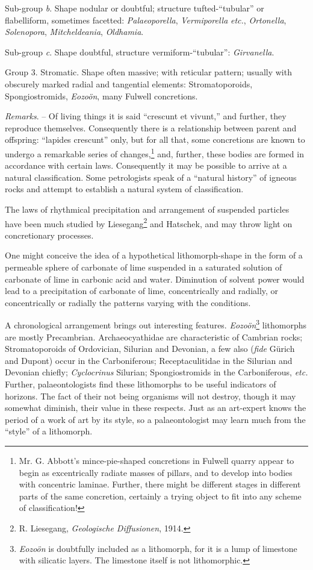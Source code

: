 \documentclass[a4paper, 12pt, oneside]{article}
\begin{document}
Sub-group \emph{b}. Shape nodular or doubtful; structure tufted-``tubular'' or flabelliform, sometimes facetted: \emph{Palaeoporella}, \emph{Vermiporella} \emph{etc.}, \emph{Ortonella}, \emph{Solenopora}, \emph{Mitcheldeania}, \emph{Oldhamia}.

Sub-group \emph{c}. Shape doubtful, structure vermiform-``tubular'': \emph{Girvanella}.

Group 3. Stromatic. Shape often massive; with reticular pattern; usually with obscurely marked radial and tangential elements: Stromatoporoids, Spongiostromids, \emph{Eozoön}, many Fulwell concretions.

\emph{Remarks}. -- Of living things it is said ``crescunt et vivunt,'' and further, they reproduce themselves. Consequently there is a relationship between parent and offspring: ``lapides crescunt'' only, but for all that, some concretions are known to undergo a remarkable series of changes,\footnote{Mr. G. Abbott's mince-pie-shaped concretions in Fulwell quarry appear to begin as excentrically radiate masses of pillars, and to develop into bodies with concentric laminae. Further, there might be different stages in different parts of the same concretion, certainly a trying object to fit into any scheme of classification!} and, further, these bodies are formed in accordance with certain laws. Consequently it may be possible to arrive at a natural classification. Some petrologists speak of a ``natural history'' of igneous rocks and attempt to establish a natural system of classification.

The laws of rhythmical precipitation and arrangement of suspended particles have been much studied by Liesegang\footnote{R. Liesegang, \emph{Geologische Diffusionen}, 1914.} and Hatschek, and may throw light on concretionary processes.

One might conceive the idea of a hypothetical lithomorph-shape in the form of a permeable sphere of carbonate of lime suspended in a saturated solution of carbonate of lime in carbonic acid and water. Diminution of solvent power would lead to a precipitation of carbonate of lime, concentrically and radially, or concentrically or radially the patterns varying with the conditions.

A chronological arrangement brings out interesting features. \emph{Eozoön}\footnote{\emph{Eozoön} is doubtfully included as a lithomorph, for it is a lump of limestone with silicatic layers. The limestone itself is not lithomorphic.} lithomorphs are mostly Precambrian. Archaeocyathidae are characteristic of Cambrian rocks; Stromatoporoids of Ordovician, Silurian and Devonian, a few also (\emph{fide} Gürich and Dupont) occur in the Carboniferous; Receptaculitidae in the Silurian and Devonian chiefly; \emph{Cyclocrinus} Silurian; Spongiostromids in the Carboniferous, \emph{etc.} Further, palaeontologists find these lithomorphs to be useful indicators of horizons. The fact of their not being organisms will not destroy, though it may somewhat diminish, their value in these respects. Just as an art-expert knows the period of a work of art by its style, so a palaeontologist may learn much from the ``style'' of a lithomorph.
\end{document}
